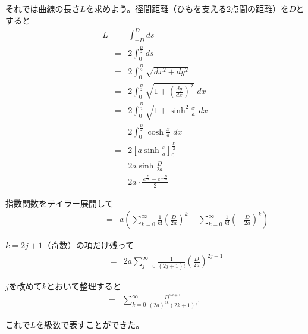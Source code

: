 それでは曲線の長さ$L$を求めよう。径間距離（ひもを支える2点間の距離）を$D$とすると
\begin{eqnarray*}
L & = & \int_{-D}^D ds \\
& = & 2 \int_0^\frac{D}{2} ds \\
& = & 2 \int_0^\frac{D}{2} \sqrt{dx^2 + dy^2} \\
& = & 2 \int_0^\frac{D}{2} \sqrt{1 + \left(\frac{dy}{dx}\right)^2}\,\,dx \\
& = & 2 \int_0^\frac{D}{2} \sqrt{1 + \sinh^2\frac{x}{a}}\,\,dx \\
& = & 2 \int_0^\frac{D}{2} \cosh \frac{x}{a}\,\,dx \\
& = & 2 \left[a\sinh \frac{x}{a}\right]_0^\frac{D}{2} \\
& = & 2a\sinh\frac{D}{2a} \\
& = & 2a\cdot\frac{\, e^{\frac{D}{2a}} - e^{-\frac{D}{2a}}}{2}
\end{eqnarray*}\par
指数関数をテイラー展開して
\begin{eqnarray*}
\qquad\qquad\qquad\quad & = & a\left(\sum_{k = 0}^\infty \frac{1}{k!}\left(\frac{D}{2a}\right)^k - \sum_{k = 0}^\infty \frac{1}{k!}\left(-\frac{D}{2a}\right)^k\right)
\end{eqnarray*}\par
$k = 2j + 1$（奇数）の項だけ残って
\begin{eqnarray*}
\qquad & = & 2a\sum_{j = 0}^\infty \frac{1}{(2j + 1)!}\left(\frac{D}{2a}\right)^{2j + 1}
\end{eqnarray*}\par
$j$を改めて$k$とおいて整理すると
\begin{eqnarray*}
& = & \sum_{k = 0}^\infty \frac{D^{2k + 1}}{(2a)^{2k}(2k + 1)!}. \quad
\end{eqnarray*}

これで$L$を級数で表すことができた。

